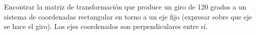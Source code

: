 Encontrar la matriz de transformación que produce un giro de 120 grados a un sistema de 
coordenadas rectangular en torno a un eje fijo (expresar sobre que eje se hace el giro). 
Los ejes coordenados son perpendiculares entre sí.